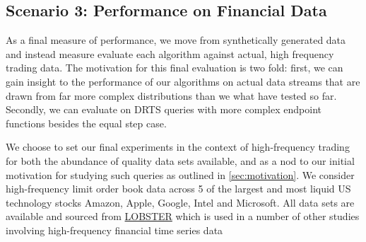 \newpage
\subsection{Scenario 3: Performance on Financial Data}
As a final measure of performance, we move from synthetically generated data and instead measure evaluate each algorithm against actual, high frequency trading data. The motivation for this final evaluation is two fold: first, we can gain insight to the performance of our algorithms on actual data streams that are drawn from far more complex distributions than we what have tested so far. Secondly, we can evaluate on DRTS queries with more complex endpoint functions besides the equal step case. 

We choose to set our final experiments in the context of high-frequency trading for both the abundance of quality data sets available, and as a nod to our initial motivation for studying such queries as outlined in \cref{sec:motivation}. We consider high-frequency limit order book data across 5 of the largest and most liquid US technology stocks Amazon, Apple, Google, Intel and Microsoft. All data sets are available and sourced from \href{https://lobsterdata.com/info/DataSamples.php}{LOBSTER} which is used in a number of other studies involving high-frequency financial time series data \cite{RePEc:hum:wpaper:sfb649dp2014-053}